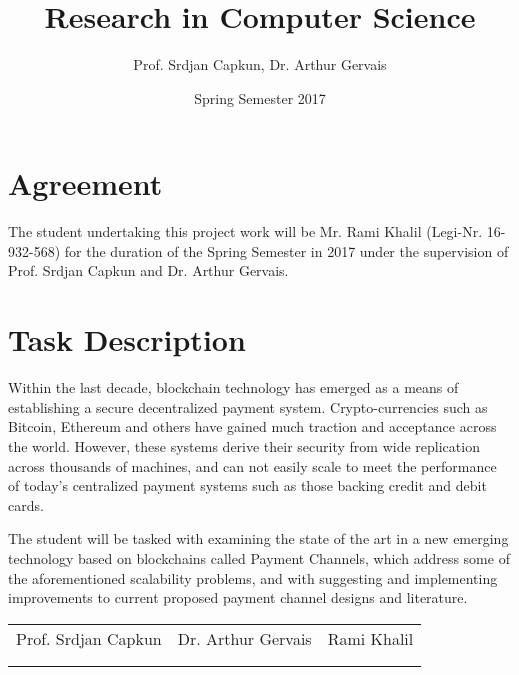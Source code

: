\documentclass[12pt]{article}
\title{Research in Computer Science}
\date{Spring Semester 2017}
\author{Prof. Srdjan Capkun, Dr. Arthur Gervais}
\begin{document}
\maketitle

\section{Agreement}
The student undertaking this project work will be Mr. Rami Khalil (Legi-Nr. 16-932-568) for the duration of the Spring Semester in 2017 under the supervision of Prof. Srdjan Capkun and Dr. Arthur Gervais.

\section{Task Description}
Within the last decade, blockchain technology has emerged as a means of establishing a secure decentralized payment system. Crypto-currencies such as Bitcoin, Ethereum and others have gained much traction and acceptance across the world. However, these systems derive their security from wide replication across thousands of machines, and can not easily scale to meet the performance of today's centralized payment systems such as those backing credit and debit cards.

The student will be tasked with examining the state of the art in a new emerging technology based on blockchains called Payment Channels, which address some of the aforementioned scalability problems, and with suggesting and implementing improvements to current proposed payment channel designs and literature.

\vspace{5em}

\begin{tabular}{c c c}

Prof. Srdjan Capkun & Dr. Arthur Gervais & Rami Khalil \\
\\

\underline{\hspace{4cm}} & \underline{\hspace{4cm}} & \underline{\hspace{4cm}} \\

\end{tabular}
\end{document}

